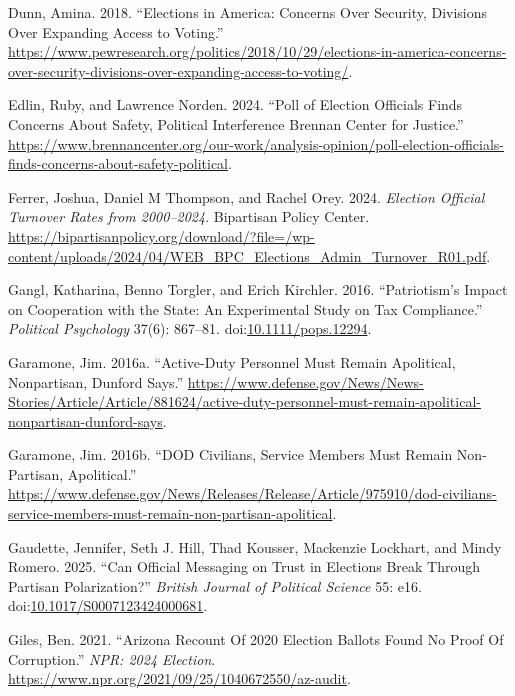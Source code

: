 \documentclass[
  12pt,
  letterpaper,
]{article}
\newlength{\cslhangindent}
\newenvironment{CSLReferences}[2] %
 {\begin{list}{}{%
  \setlength{\itemindent}{0pt}
  \setlength{\leftmargin}{0pt}
  \setlength{\parsep}{0pt}
  \ifodd #1
   \setlength{\leftmargin}{\cslhangindent}
   \setlength{\itemindent}{-1\cslhangindent}
  \fi
  \setlength{\itemsep}{#2\baselineskip}}}
 {\end{list}}
\begin{document}
\begin{CSLReferences}{1}{1}
Dunn, Amina. 2018. {``Elections in {America}: {Concerns Over Security},
{Divisions Over Expanding Access} to {Voting}.''}
\url{https://www.pewresearch.org/politics/2018/10/29/elections-in-america-concerns-over-security-divisions-over-expanding-access-to-voting/}.

Edlin, Ruby, and Lawrence Norden. 2024. {``Poll of {Election Officials
Finds Concerns About Safety}, {Political Interference} \textbar{}
{Brennan Center} for {Justice}.''}
\url{https://www.brennancenter.org/our-work/analysis-opinion/poll-election-officials-finds-concerns-about-safety-political}.

Ferrer, Joshua, Daniel M Thompson, and Rachel Orey. 2024. \emph{Election
{Official Turnover Rates} from 2000--2024}. Bipartisan Policy Center.
\url{https://bipartisanpolicy.org/download/?file=/wp-content/uploads/2024/04/WEB_BPC_Elections_Admin_Turnover_R01.pdf}.

Gangl, Katharina, Benno Torgler, and Erich Kirchler. 2016.
{``Patriotism's {Impact} on {Cooperation} with the {State}: {An
Experimental Study} on {Tax Compliance}.''} \emph{Political Psychology}
37(6): 867--81.
doi:\href{https://doi.org/10.1111/pops.12294}{10.1111/pops.12294}.

Garamone, Jim. 2016a. {``Active-{Duty Personnel Must Remain Apolitical},
{Nonpartisan}, {Dunford Says}.''}
\url{https://www.defense.gov/News/News-Stories/Article/Article/881624/active-duty-personnel-must-remain-apolitical-nonpartisan-dunford-says}.

Garamone, Jim. 2016b. {``{DOD} Civilians, Service Members Must Remain
Non-Partisan, Apolitical.''}
\url{https://www.defense.gov/News/Releases/Release/Article/975910/dod-civilians-service-members-must-remain-non-partisan-apolitical}.

Gaudette, Jennifer, Seth J. Hill, Thad Kousser, Mackenzie Lockhart, and
Mindy Romero. 2025. {``Can {Official Messaging} on {Trust} in {Elections
Break Through Partisan Polarization}?''} \emph{British Journal of
Political Science} 55: e16.
doi:\href{https://doi.org/10.1017/S0007123424000681}{10.1017/S0007123424000681}.

Giles, Ben. 2021. {``Arizona {Recount Of} 2020 {Election Ballots Found
No Proof Of Corruption}.''} \emph{NPR: 2024 Election}.
\url{https://www.npr.org/2021/09/25/1040672550/az-audit}.


\end{CSLReferences}
\end{document}
